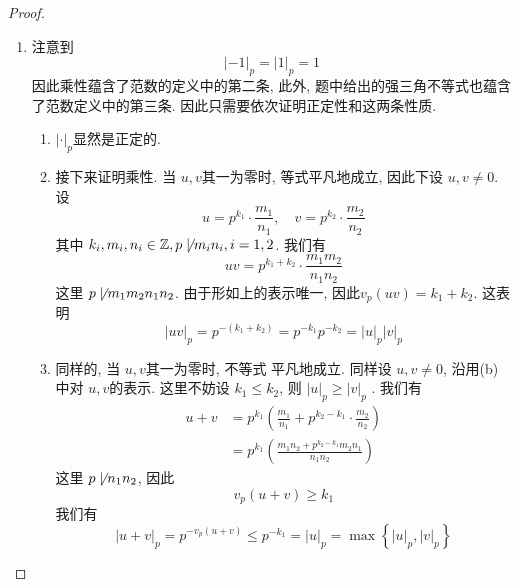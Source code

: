 \documentclass[../main.tex]{subfiles}
\begin{document}
\begin{proof}
    \begin{enumerate}
        \item  注意到 \[
        \left| -1 \right|_{p}= \left| 1 \right|_{p}= 1  
        \]因此乘性蕴含了范数的定义中的第二条, 此外, 题中给出的强三角不等式也蕴含了范数定义中的第三条. 因此只需要依次证明正定性和这两条性质. \begin{enumerate}
            \item \(  \left| \cdot  \right|_{p}   \)显然是正定的.
            \item 接下来证明乘性. 当 \(  u,v  \)其一为零时, 等式平凡地成立, 因此下设 \(  u,v\neq 0  \).  设 \[
            u= p^{k_1}\cdot \frac{m_1 }{n_1 },\quad v= p^{k_2}\cdot \frac{m_2 }{n_2 }  
            \]其中 \(  k_{i},m_{i},n_{i}\in \mathbb{Z} , p\not \mid m_{i}n_{i}, i= 1,2  \). 我们有 \[
           uv= p^{k_1+ k_2}\cdot \frac{m_1m_2 }{n_1n_2 } 
            \] 这里 \(  p\not \mid  m_1m_2n_1n_2\). 由于形如上的表示唯一, 因此\(  v_{p}\left( uv \right)= k_1+ k_2   \). 这表明 \[
            \left| uv \right|_{p}= p^{-\left( k_1+ k_2 \right) }= p^{-k_1}p^{-k_2} = \left| u \right|_{p}\left| v \right|_{p}  
            \] 
            \item 同样的, 当 \(  u,v  \)其一为零时, 不等式 平凡地成立. 同样设 \(  u,v \neq 0  \), 沿用(b)中对 \(  u,v  \)的表示. 这里不妨设 \(  k_1\le k_2  \), 则 \(  \left| u \right|_{p}\ge \left| v \right|_{p}    \)  . 我们有 \[
       \begin{aligned}
          u+ v&= p^{k_1}\left( \frac{m_1 }{n_1 }+ p^{k_2-k_1}\cdot \frac{m_2 }{n_2 }   \right)  \\ 
           &= p^{k_1}\left( \frac{m_1n_2+ p^{k_2-k_1}m_2n_1 }{n_1n_2 }  \right) 
       \end{aligned}
            \]这里 \(  p\not \mid  n_1n_2\), 因此 \[
            v_{p}\left( u+ v \right)\ge k_1
            \] 我们有 \[
            \left| u+ v \right|_{p}= p^{-v_{p}\left( u+ v \right) }\le p^{-k_1} = \left| u \right|_{p}=  \max \left\{ \left| u \right|_{p},\left| v \right|_{p}   \right\}
            \]
           

\end{enumerate}
\end{enumerate}
\end{proof}
\end{document}
